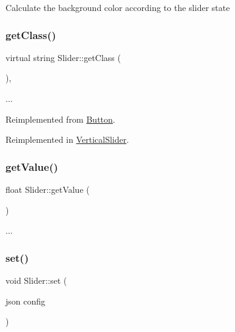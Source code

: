 Calculate the background color according to the slider state \mbox{\label{class_slider_a0e917883961af99856847e571a461689}} 
\subsubsection{\texorpdfstring{get\+Class()}{getClass()}}
{\footnotesize\ttfamily virtual string Slider\+::get\+Class (\begin{DoxyParamCaption}{ }\end{DoxyParamCaption})\hspace{0.3cm}{\ttfamily [inline]}, {\ttfamily [virtual]}}

... 

Reimplemented from \hyperlink{class_button_ad22978c530f78e58cb213436b24b37c0}{Button}.



Reimplemented in \hyperlink{class_vertical_slider_a5e13fb542bdca4cca91f96ca15b28fad}{Vertical\+Slider}.

\mbox{\label{class_slider_a8202efdd0e9c26277e7934949ae87537}} 
\subsubsection{\texorpdfstring{get\+Value()}{getValue()}}
{\footnotesize\ttfamily float Slider\+::get\+Value (\begin{DoxyParamCaption}{ }\end{DoxyParamCaption})}

... \mbox{\label{class_slider_a834dbe16812e7bd4f0472882b0619ea9}} 
\subsubsection{\texorpdfstring{set()}{set()}}
{\footnotesize\ttfamily void Slider\+::set (\begin{DoxyParamCaption}\item[{json}]{config }\end{DoxyParamCaption})\hspace{0.3cm}{\ttfamily [virtual]}}

